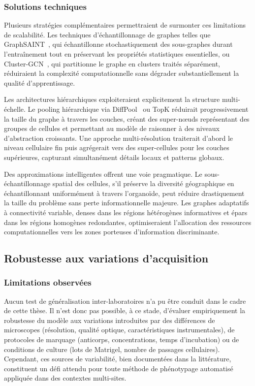 \subsubsection{Solutions techniques}

Plusieurs stratégies complémentaires permettraient de surmonter ces limitations de scalabilité. Les techniques d'échantillonnage de graphes telles que GraphSAINT~\cite{Zeng2020}, qui échantillonne stochastiquement des sous-graphes durant l'entraînement tout en préservant les propriétés statistiques essentielles, ou Cluster-GCN~\cite{Chiang2019}, qui partitionne le graphe en clusters traités séparément, réduiraient la complexité computationnelle sans dégrader substantiellement la qualité d'apprentissage.

Les architectures hiérarchiques exploiteraient explicitement la structure multi-échelle. Le pooling hiérarchique via DiffPool~\cite{Ying2018} ou TopK réduirait progressivement la taille du graphe à travers les couches, créant des super-nœuds représentant des groupes de cellules et permettant au modèle de raisonner à des niveaux d'abstraction croissants. Une approche multi-résolution traiterait d'abord le niveau cellulaire fin puis agrégerait vers des super-cellules pour les couches supérieures, capturant simultanément détails locaux et patterns globaux.

Des approximations intelligentes offrent une voie pragmatique. Le sous-échantillonnage spatial des cellules, s'il préserve la diversité géographique en échantillonnant uniformément à travers l'organoïde, peut réduire drastiquement la taille du problème sans perte informationnelle majeure. Les graphes adaptatifs à connectivité variable, denses dans les régions hétérogènes informatives et épars dans les régions homogènes redondantes, optimiseraient l'allocation des ressources computationnelles vers les zones porteuses d'information discriminante.

\subsection{Robustesse aux variations d'acquisition}

\subsubsection{Limitations observées}

Aucun test de généralisation inter-laboratoires n’a pu être conduit dans le cadre de cette thèse. Il n’est donc pas possible, à ce stade, d’évaluer empiriquement la robustesse du modèle aux variations introduites par des différences de microscopes (résolution, qualité optique, caractéristiques instrumentales), de protocoles de marquage (anticorps, concentrations, temps d’incubation) ou de conditions de culture (lots de Matrigel, nombre de passages cellulaires). Cependant, ces sources de variabilité, bien documentées dans la littérature, constituent un défi attendu pour toute méthode de phénotypage automatisé appliquée dans des contextes multi-sites.

